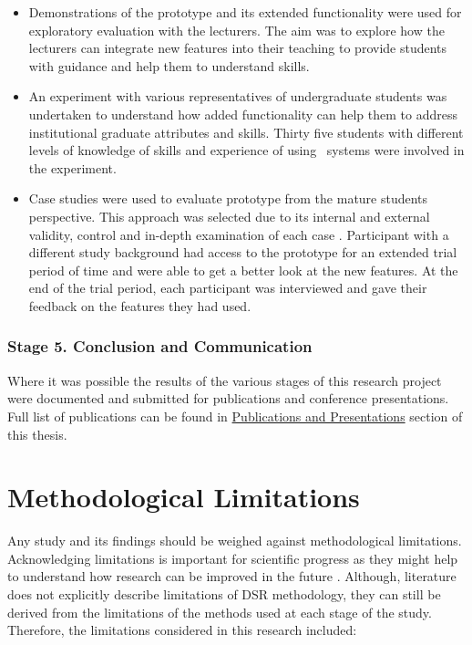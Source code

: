 \begin{itemize}
  \item Demonstrations of the prototype and its extended functionality were used
  for exploratory evaluation with the lecturers. The aim was to explore how the
  lecturers can integrate new features into their teaching to provide students
  with guidance and help them to understand \LLLs skills.
  
  \item An experiment with various representatives of undergraduate students
  was undertaken to understand how added functionality can help them to address
  institutional graduate attributes and \LLLs skills. Thirty five students with
  different levels of knowledge of \LLLs skills and experience of using
  \ep~systems were involved in the experiment.

  \item Case studies were used to evaluate prototype from the mature students
  perspective. This approach was selected due to its internal and external
  validity, control and in-depth examination of each case \citep{Yin2009}.
  Participant with a different study background had access to the prototype for
  an extended trial period of time and were able to get a better look at the new
  features. At the end of the trial period, each participant was interviewed and
  gave their feedback on the features they had used.
\end{itemize}

\subsubsection{Stage 5. Conclusion and Communication}

Where it was possible the results of the various stages of this research project
were documented and submitted for publications and conference presentations. Full
list of publications can be found in \hyperref[sec:pub]{Publications and
Presentations} section of this thesis.

\section{Methodological Limitations}
\label{sec:limits}

Any study and its findings should be weighed against methodological
limitations. Acknowledging limitations is important for scientific progress as
they might help to understand how research can be improved in the future
\citep{Ioannidis2007}. Although, literature does not explicitly describe
limitations of DSR methodology, they can still be derived from the limitations
of the methods used at each stage of the study. Therefore, the limitations
considered in this research included:

